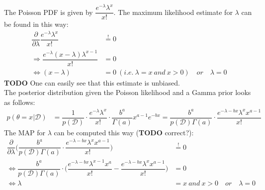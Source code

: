 \documentclass[11pt]{article}
\newcommand{\exercise}{\section{}}
\begin{document}
\exercise
The Poisson PDF is given by $\dfrac{e^{-\lambda}\lambda^x}{x!}$. The maximum likelihood estimate for $\lambda$ can be found in this way:
\begin{align*}
	\dfrac{\partial}{\partial \lambda}\dfrac{e^{-\lambda}\lambda^x}{x!} &\stackrel{!}{=} 0\\
	\Rightarrow \dfrac{e^{-\lambda}(x-\lambda)\lambda^{x-1}}{x!} &= 0\\
	\iff (x-\lambda) &= 0\ (i.e.\ \lambda=x\ and\ x>0) \quad or\quad \lambda = 0
\end{align*}
\textbf{TODO} One can easily see that this estimate is unbiased.\\

\noindent The posterior distribution given the Poisson likelihood and a Gamma prior looks as follows:
\begin{align*}
	p(\theta=x|\mathcal{D}) &= \dfrac{1}{p(\mathcal{D})} \cdot \dfrac{e^{-\lambda}\lambda^x}{x!} \cdot \dfrac{b^a}{\Gamma(a)}x^{a-1}e^{-bx} = \dfrac{b^a}{p(\mathcal{D})\Gamma(a)} \cdot \dfrac{e^{-\lambda-bx}\lambda^x x^{a-1}}{x!}
\end{align*}
The MAP for $\lambda$ can be computed this way (\textbf{TODO} correct?):
\begin{align*}
	\dfrac{\partial}{\partial \lambda}\Big(\dfrac{b^a}{p(\mathcal{D})\Gamma(a)} \cdot \dfrac{e^{-\lambda-bx}\lambda^x x^{a-1}}{x!}\Big) &\stackrel{!}{=} 0\\
	\iff \dfrac{b^a}{p(\mathcal{D})\Gamma(a)} \cdot \Big(\dfrac{e^{-\lambda-bx} \lambda^{x-1} x^{a}}{x!} - \dfrac{e^{-\lambda-bx} \lambda^{x} x^{a-1}}{x!} \Big) &= 0\\
	\iff \lambda&=x\ and\ x>0 \quad or\quad \lambda = 0
\end{align*}
\end{document}
